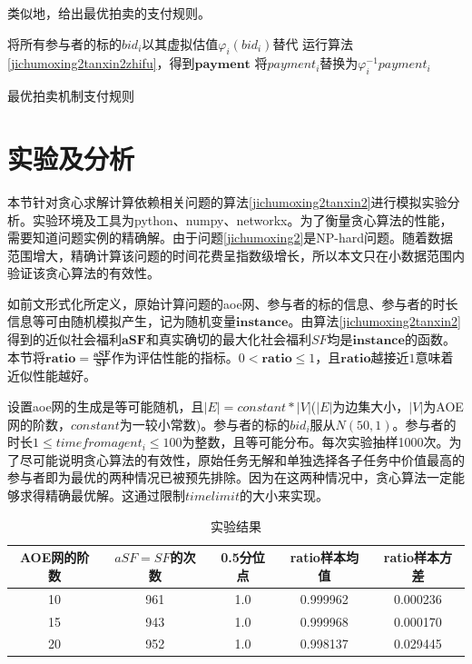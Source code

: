 \documentclass[promaster]{thesis-uestc}
\begin{document}
类似地，给出最优拍卖的支付规则。

\begin{algorithm}[H] 
    将所有参与者的标的$bid_i$以其虚拟估值$\varphi _i(bid_i)$替代\;
    运行算法\ref{jichumoxing2tanxin2zhifu}，得到$\mathbf{payment}$\;
    {
        将$payment_i$替换为$\varphi _{i}^{-1}{payment_i}$
    }
\caption{最优拍卖机制支付规则}
\label{optimalauctionzhifu}
\end{algorithm}

\section{实验及分析}
本节针对贪心求解计算依赖相关问题的算法\ref{jichumoxing2tanxin2}进行模拟实验分析。实验环境及工具为python、numpy、networkx。为了衡量贪心算法的性能，需要知道问题实例的精确解。由于问题\ref{jichumoxing2}是NP-hard问题。随着数据范围增大，精确计算该问题的时间花费呈指数级增长，所以本文只在小数据范围内验证该贪心算法的有效性。

如前文形式化所定义，原始计算问题的aoe网、参与者的标的信息、参与者的时长信息等可由随机模拟产生，记为随机变量$\mathbf{instance}$。由算法\ref{jichumoxing2tanxin2}得到的近似社会福利$\mathbf{aSF}$和真实确切的最大化社会福利$SF$均是$\mathbf{instance}$的函数。本节将$\mathbf{ratio} = \frac{\mathbf{aSF}}{\mathbf{SF}}$作为评估性能的指标。$0<\mathbf{ratio} \leq 1$，且$\mathbf{ratio}$越接近$1$意味着近似性能越好。

设置aoe网的生成是等可能随机，且$|E|=constant*|V|$($|E|$为边集大小，$|V|$为AOE网的阶数，$constant$为一较小常数)。参与者的标的$bid_i$服从$N(50,1)$。参与者的时长$1\leq timefromagent_i\leq 100$为整数，且等可能分布。每次实验抽样1000次。为了尽可能说明贪心算法的有效性，原始任务无解和单独选择各子任务中价值最高的参与者即为最优的两种情况已被预先排除。因为在这两种情况中，贪心算法一定能够求得精确最优解。这通过限制$timelimit$的大小来实现。

\begin{table}[h]
\caption{实验结果}
\label{jinsizhibiao}
\begin{tabular}{ccccc}
    \toprule
    AOE网的阶数&$aSF=SF$的次数&0.5分位点&ratio样本均值&ratio样本方差\\
    \midrule
    10&961&1.0&0.999962&0.000236\\
    15&943&1.0&0.999968&0.000170\\
    20&952&1.0&0.998137&0.029445\\
    \bottomrule
\end{tabular}
\end{table}
\end{document}
